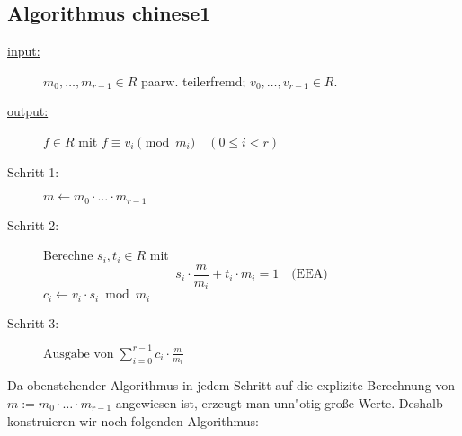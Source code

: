 \documentclass{article}
\begin{document}
\subsection*{Algorithmus chinese1}
\begin{description}
		\item[\underline{input:}] $m_0, \dots, m_{r-1} \in R$ paarw. teilerfremd; $v_0, \dots, v_{r-1} \in R$.
		\item[\underline{output:}] $f \in R$ mit $f \equiv v_i \pmod m_i \quad (0 \le i < r)$
		\item[Schritt 1:] $m \longleftarrow m_0 \cdot \dotso \cdot m_{r-1}$
		\item[Schritt 2:] Berechne $s_i, t_i \in R$ mit $$s_i \cdot \frac{m}{m_i} + t_i \cdot m_i = 1 \quad \mbox{(EEA)}$$ $c_i \longleftarrow v_i \cdot s_i \bmod m_i$
		\item[Schritt 3:] $\text{Ausgabe von} \; \sum_{i=0}^{r-1} c_i \cdot \frac{m}{m_i}$
\end{description}
Da obenstehender Algorithmus in jedem Schritt auf die explizite Berechnung von $m := m_0 \cdot \dotso \cdot m_{r-1}$ angewiesen ist, erzeugt man unn"otig gro\ss e Werte. Deshalb konstruieren wir noch folgenden Algorithmus:
\end{document}

